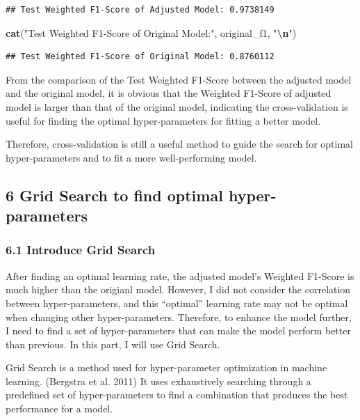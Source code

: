 \documentclass[
]{article}
\newenvironment{Shaded}{\begin{snugshade}}{\end{snugshade}}
\newcommand{\FunctionTok}[1]{\textcolor[rgb]{0.13,0.29,0.53}{\textbf{#1}}}
\newcommand{\NormalTok}[1]{#1}
\newcommand{\SpecialCharTok}[1]{\textcolor[rgb]{0.81,0.36,0.00}{\textbf{#1}}}
\newcommand{\StringTok}[1]{\textcolor[rgb]{0.31,0.60,0.02}{#1}}
\begin{document}
\begin{verbatim}
## Test Weighted F1-Score of Adjusted Model: 0.9738149
\end{verbatim}

\begin{Shaded}
\begin{Highlighting}[]
\FunctionTok{cat}\NormalTok{(}\StringTok{"Test Weighted F1{-}Score of Original Model:"}\NormalTok{, original\_f1, }\StringTok{"}\SpecialCharTok{\textbackslash{}n}\StringTok{"}\NormalTok{)}
\end{Highlighting}
\end{Shaded}

\begin{verbatim}
## Test Weighted F1-Score of Original Model: 0.8760112
\end{verbatim}

From the comparison of the Test Weighted F1-Score between the adjusted
model and the original model, it is obvious that the Weighted F1-Score
of adjusted model is larger than that of the original model, indicating
the cross-validation is useful for finding the optimal hyper-parameters
for fitting a better model.

Therefore, cross-validation is still a useful method to guide the search
for optimal hyper-parameters and to fit a more well-performing model.

\subsection{6 Grid Search to find optimal
hyper-parameters}\label{grid-search-to-find-optimal-hyper-parameters}

\subsubsection{6.1 Introduce Grid Search}\label{introduce-grid-search}

After finding an optimal learning rate, the adjusted model's Weighted
F1-Score is much higher than the origianl model. However, I did not
consider the correlation between hyper-parameters, and this ``optimal''
learning rate may not be optimal when changing other hyper-parameters.
Therefore, to enhance the model further, I need to find a set of
hyper-parameters that can make the model perform better than previous.
In this part, I will use Grid Search.

Grid Search is a method used for hyper-parameter optimization in machine
learning. (Bergstra et al. 2011) It uses exhaustively searching through
a predefined set of hyper-parameters to find a combination that produces
the best performance for a model.
\end{document}

